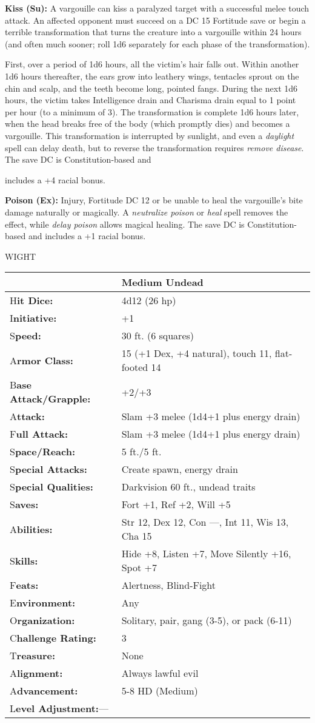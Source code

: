 \documentclass{article}
\begin{document}
\textbf{Kiss (Su):} A vargouille can kiss a paralyzed target with a successful 
melee touch attack. An affected opponent must succeed on a DC 15 Fortitude save 
or begin a terrible transformation that turns the creature into a vargouille within 
24 hours (and often much sooner; roll 1d6 separately for each phase of the transformation).

First, over a period of 1d6 hours, all the victim's hair falls out. Within another 
1d6 hours thereafter, the ears grow into leathery wings, tentacles sprout on the 
chin and scalp, and the teeth become long, pointed fangs. During the next 1d6 hours, 
the victim takes Intelligence drain and Charisma drain equal to 1 point per hour 
(to a minimum of 3). The transformation is complete 1d6 hours later, when the head 
breaks free of the body (which promptly dies) and becomes a vargouille. This transformation 
is interrupted by sunlight, and even a \textit{daylight }spell can delay death, 
but to reverse the transformation requires \textit{remove disease}. The save DC 
is Constitution-based and

includes a +4 racial bonus.

\textbf{Poison (Ex):} Injury, Fortitude DC 12 or be unable to heal the vargouille's 
bite damage naturally or magically. A \textit{neutralize poison }or \textit{heal 
}spell removes the effect, while \textit{delay poison }allows magical healing. 
The save DC is Constitution-based and includes a +1 racial bonus.

\vspace{12pt}
{\LARGE{}WIGHT}

\begin{tabular}{|>{\raggedright}p{91pt}|>{\raggedright}p{193pt}|}
\hline
 & Medium Undead\tabularnewline
\hline
H\textbf{it Dice:} & 4d12 (26 hp)\tabularnewline
\hline
I\textbf{nitiative:} & +1\tabularnewline
\hline
S\textbf{peed:} & 30 ft. (6 squares)\tabularnewline
\hline
A\textbf{rmor Class:} & 15 (+1 Dex, +4 natural), touch 11, flat-footed 14\tabularnewline
\hline
B\textbf{ase Attack/Grapple:} & +2/+3\tabularnewline
\hline
A\textbf{ttack:} & Slam +3 melee (1d4+1 plus energy drain)\tabularnewline
\hline
F\textbf{ull Attack:} & Slam +3 melee (1d4+1 plus energy drain)\tabularnewline
\hline
S\textbf{pace/Reach:} & 5 ft./5 ft.\tabularnewline
\hline
S\textbf{pecial Attacks:} & Create spawn, energy drain\tabularnewline
\hline
S\textbf{pecial Qualities:} & Darkvision 60 ft., undead traits\tabularnewline
\hline
S\textbf{aves:} & Fort +1, Ref +2, Will +5\tabularnewline
\hline
A\textbf{bilities:} & Str 12, Dex 12, Con ---, Int 11, Wis 13, Cha 15\tabularnewline
\hline
S\textbf{kills:} & Hide +8, Listen +7, Move Silently +16, Spot +7 \tabularnewline
\hline
F\textbf{eats:} & Alertness, Blind-Fight\tabularnewline
\hline
E\textbf{nvironment:} & Any\tabularnewline
\hline
O\textbf{rganization:} & Solitary, pair, gang (3-5), or pack (6-11)\tabularnewline
\hline
C\textbf{hallenge Rating:} & 3\tabularnewline
\hline
T\textbf{reasure:} & None\tabularnewline
\hline
A\textbf{lignment:} & Always lawful evil\tabularnewline
\hline
A\textbf{dvancement:} & 5-8 HD (Medium)\tabularnewline
\hline
L\textbf{evel Adjustment:}--- & \tabularnewline
\hline
\end{tabular}
\end{document}
